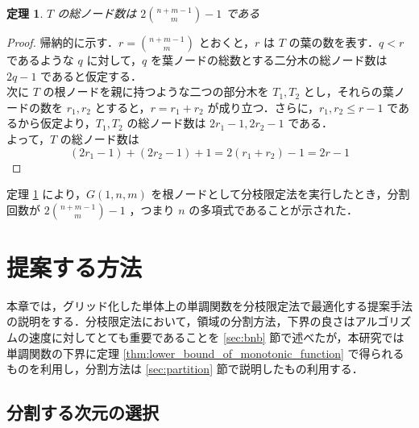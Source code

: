 \documentclass[a4paper,11pt]{jreport}
\newtheorem{theorem}{定理}
\begin{document}
\begin{theorem} \label{thm:total_node}
$ T $ の総ノード数は $ 2 \binom{n + m - 1}{m} - 1 $ である
\end{theorem}
\begin{proof}
帰納的に示す．$ r = \binom{n + m - 1}{m} $ とおくと，$ r $ は $ T $ の葉の数を表す．$ q < r $ であるような $ q $ に対して，$ q $ を葉ノードの総数とする二分木の総ノード数は $ 2q - 1 $ であると仮定する．\\
次に $ T $ の根ノードを親に持つような二つの部分木を $ T_1, T_2 $ とし，それらの葉ノードの数を $ r_1, r_2 $ とすると，$ r = r_1 + r_2 $ が成り立つ．さらに，$ r_1, r_2 \leq r - 1 $ であるから仮定より，$ T_1, T_2 $ の総ノード数は $ 2r_1 - 1, 2r_2 - 1 $ である．\\
よって，$ T $ の総ノード数は
$$ (2r_1 - 1) + (2r_2 - 1) + 1 = 2(r_1 + r_2) - 1 = 2r - 1 $$
\end{proof}

定理 \ref{thm:total_node} により，$ G(1, n, m) $ を根ノードとして分枝限定法を実行したとき，分割回数が $ 2 \binom{n + m - 1}{m} - 1 $ ，つまり $ n $ の多項式であることが示された．

\chapter{提案する方法}

本章では，グリッド化した単体上の単調関数を分枝限定法で最適化する提案手法の説明をする．分枝限定法において，領域の分割方法，下界の良さはアルゴリズムの速度に対してとても重要であることを \ref{sec:bnb} 節で述べたが，本研究では単調関数の下界に定理  \ref{thm:lower_bound_of_monotonic_function} で得られるものを利用し，分割方法は \ref{sec:partition} 節で説明したもの利用する．\par

\section{分割する次元の選択}
\end{document}
